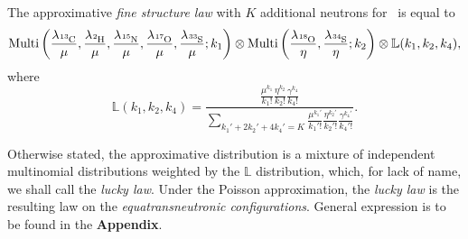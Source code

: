 \begin{result}\label{Fine structure law}
	The approximative \emph{fine structure law} with $K$ additional neutrons for \molecule\, is equal to 
	{\small
		\begin{equation*}
			\mathrm{Multi} \left(
				\frac{ \lambda_\cem{^{13}C} }{ \mu }, 
				\frac{ \lambda_\cem{^{2} H} }{ \mu }, 
				\frac{ \lambda_\cem{^{15}N} }{ \mu },
				\frac{ \lambda_\cem{^{17}O} }{ \mu }, 
				\frac{ \lambda_\cem{^{33}S} }{ \mu }; 
				k_1
			\right ) \otimes
			\mathrm{Multi} \left(
				\frac{ \lambda_\cem{^{18}O} }{ \eta },
				\frac{ \lambda_\cem{^{34}S} }{ \eta }; 
				k_2	
			\right) \otimes 
			\mathbb{L}( k_1, k_2, k_4 ),
		\end{equation*}
	}
	where 
	\begin{equation}\label{simple lucky law}
		\mathbb{L}( k_1, k_2, k_4 ) = 
		\frac{ \frac{ \mu^{k_1} }{ k_1! } \frac{ \eta^{k_2}}{ k_2! } \frac{ \gamma^{k_4} }{ k_4! } }{ 
			\underset{ k_1' + 2 k_2' + 4 k_4' = K}{\sum} 
				\frac{ \mu^{k_1'} }{ k_1'! } 
				\frac{ \eta^{k_2'}}{ k_2'! } 
				\frac{ \gamma^{k_4'}}{ k_4'! }
		}.
	\end{equation}
\end{result}

Otherwise stated, the approximative distribution is a mixture of independent multinomial distributions weighted by the $\mathbb{L}$ distribution, which, for lack of name, we shall call the {\it lucky law}. Under the Poisson approximation, the {\it lucky law} is the resulting law on the {\it equatransneutronic configurations}. General expression is to be found in the \textbf{Appendix}.